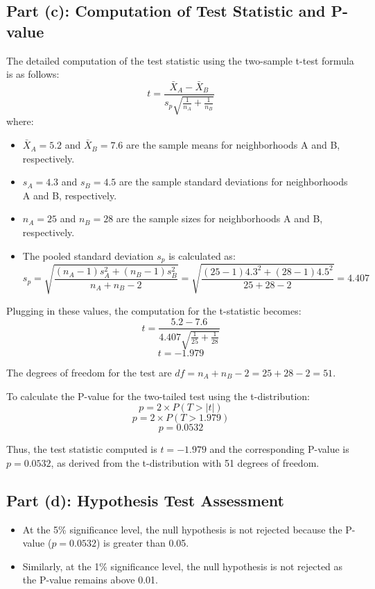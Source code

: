 \documentclass{article}
\begin{document}
\subsection*{Part (c): Computation of Test Statistic and P-value}
The detailed computation of the test statistic using the two-sample t-test formula is as follows:
\[ t = \frac{\bar{X}_A - \bar{X}_B}{s_p \sqrt{\frac{1}{n_A} + \frac{1}{n_B}}} \]
where:
\begin{itemize}
    \item \(\bar{X}_A = 5.2\) and \(\bar{X}_B = 7.6\) are the sample means for neighborhoods A and B, respectively.
    \item \(s_A = 4.3\) and \(s_B = 4.5\) are the sample standard deviations for neighborhoods A and B, respectively.
    \item \(n_A = 25\) and \(n_B = 28\) are the sample sizes for neighborhoods A and B, respectively.
    \item The pooled standard deviation \(s_p\) is calculated as:
    \[ s_p = \sqrt{\frac{(n_A-1)s_A^2 + (n_B-1)s_B^2}{n_A + n_B - 2}} = \sqrt{\frac{(25-1)4.3^2 + (28-1)4.5^2}{25 + 28 - 2}} = 4.407 \]
\end{itemize}
Plugging in these values, the computation for the t-statistic becomes:
\[ t = \frac{5.2 - 7.6}{4.407 \sqrt{\frac{1}{25} + \frac{1}{28}}} \]
\[ t = -1.979 \]

The degrees of freedom for the test are \(df = n_A + n_B - 2 = 25 + 28 - 2 = 51\).

To calculate the P-value for the two-tailed test using the t-distribution:
\[ p = 2 \times P(T > |t|) \]
\[ p = 2 \times P(T > 1.979) \]
\[ p = 0.0532 \]

Thus, the test statistic computed is \( t = -1.979 \) and the corresponding P-value is \( p = 0.0532 \), as derived from the t-distribution with 51 degrees of freedom.


\subsection*{Part (d): Hypothesis Test Assessment}
\begin{itemize}
    \item At the 5\% significance level, the null hypothesis is not rejected because the P-value (\(p = 0.0532\)) is greater than 0.05.
    \item Similarly, at the 1\% significance level, the null hypothesis is not rejected as the P-value remains above 0.01.
\end{itemize}
\end{document}
